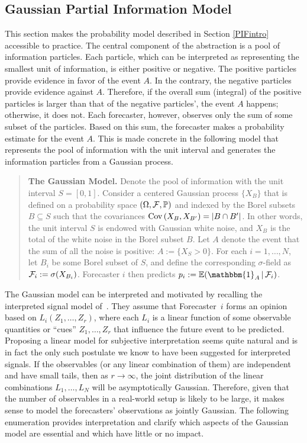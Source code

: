 \documentclass[12pt]{article}
\renewcommand{\P}{\mathbb{P}}
\newcommand{\E}{\mathbb{E}}
\theoremstyle{definition}
\theoremstyle{definition}
\def\one{\mathbbm{1}}
\def\F{{\cal F}}
\def\P{{\mathbb P}}
\def\E{{\mathbb E}}
\def\Cov{{\rm Cov}\,}
\def\|{\, | \,}
\begin{document}
\subsection{Gaussian Partial Information Model}
\label{ss:Gaussian}
This section makes the probability model described in Section \ref{PIFintro} accessible to practice. The central component of the abstraction is a pool of information particles. Each particle, which can be interpreted as representing the smallest unit of information, is either positive or negative. The positive particles provide evidence in favor of the event $A$. 
In the contrary, the negative particles provide evidence against $A$. Therefore, if the overall sum (integral) of the positive particles is larger than that of the negative particles', the event $A$ happens; otherwise, it does not. Each forecaster, however, observes only the sum of some subset of the particles. Based on this sum, the forecaster makes a probability estimate for the event $A$. This is made concrete in the following model that  represents the pool of information with the unit interval and generates the information particles from a Gaussian process. 

\begin{quote}
{\bf The Gaussian Model.} Denote the pool of information with the unit interval $S = [0,1]$. Consider a centered Gaussian process $\{X_B\}$ that is defined on a probability space $(\Omega
, \F , \P)$ and indexed by the Borel subsets $B \subseteq S$ such that the
covariances $\Cov (X_B , X_{B'}) = |B \cap B'|$.  In other words, the
unit interval $S$ is endowed with Gaussian white noise, and $X_B$ is the
total of the white noise in the Borel subset $B$.  Let $A$ denote the
event that the sum of all the noise is positive: $A := \{ X_S > 0 \}$.
For each $i = 1, \dots, N$, let $B_i$ be some Borel subset of $S$, and
define the corresponding $\sigma$-field as $\F_i := \sigma (X_{B_i})$. Forecaster $i$ then predicts $p_i :=
\E (\one_A \| \F_i)$.
\end{quote}

The Gaussian model can be interpreted and motivated by recalling the interpreted signal
model of~\citet{broomell2009experts}. They assume that
Forecaster~$i$ forms an opinion based on $L_i (Z_1 , \ldots , Z_r)$,
where each $L_i$ is a linear function of some observable quantities or ``cues''
$Z_1 , \ldots , Z_r$ that influence the future event to be predicted.  Proposing a linear model for subjective
interpretation seems quite natural and is in fact the only such
postulate we know to have been suggested for interpreted signals.  If
the observables (or any linear combination of them) are independent
and have small tails, then as $r \to \infty$, the joint distribution
of the linear combinations $L_1 , \ldots , L_N$ will be asymptotically
Gaussian.  Therefore, given that the number of observables in a real-world setup is likely to be large, it makes sense
to model the forecasters' observations as jointly Gaussian.  The
following enumeration provides interpretation and clarify which
aspects of the Gaussian model are essential and which have little or
no impact.
\end{document}
